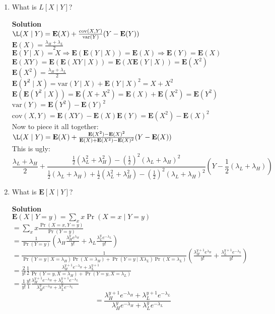 \documentclass[11pt]{article}
\newenvironment{Parts}{\begin{enumerate}[label=(\alph*)]}{\end{enumerate}}
\newcommand*{\Part}{\item}
\newenvironment{Answer}{\vspace{10pt}\begin{mdframed}\textbf{Solution}\\}{\end{mdframed}\vfill\pagebreak[3]}
\newenvironment{Answer}{\vspace{10pt}}{\vfill\pagebreak[3]}
\newcommand*{\E}{\textbf{E}}
\newcommand*{\var}[1]{\text{var}(#1)}
\newcommand*{\cov}[1]{\text{cov}(#1)}
\begin{document}
\begin{Parts}    
  \Part What is $L[X \mid Y]$?
  \begin{Answer}
$\L(X \mid Y)=\E(X)+\frac{\cov{X,Y}}{\var{Y}}(Y-\E(Y))$\\
$\E(X)=\frac{\lambda_H+\lambda_L}{2}$\\
$\E(Y \mid X)=X \Rightarrow \E(\E(Y \mid X))=\E(X) \Rightarrow \E(Y)=\E(X)$\\
$\E(XY)=\E(\E(XY \mid X))=\E(X\E(Y \mid X))=\E(X^2)$\\
$\E(X^2)=\frac{\lambda_H+\lambda_L}{2}$\\
$\E(Y^2 \mid X)=\var{Y \mid X}+\E(Y \mid X)^2=X+X^2$\\
$\E(\E(Y^2 \mid X))=\E(X+X^2)=\E(X)+\E(X^2)=\E(Y^2)$\\
$\var{Y}=\E(Y^2)-\E(Y)^2$\\
$\cov{X,Y}=\E(XY)-\E(X)\E(Y)=\E(X^2)-\E(X)^2$\\
Now to piece it all together:\\
$\L(X \mid Y)=\E(X)+\frac{\E(X^2)-\E(X)^2}{\E(X)+\E(X^2)-\E(X)^2}(Y-\E(X))$\\
This is ugly:\\
$$\frac{\lambda_L+\lambda_H}{2}+\frac{\frac{1}{2}(\lambda_L^2+\lambda_H^2)-(\frac{1}{2})^2(\lambda_L+\lambda_H)^2}{\frac{1}{2}(\lambda_L+\lambda_H)+\frac{1}{2}(\lambda_L^2+\lambda_H^2)-(\frac{1}{2})^2(\lambda_L+\lambda_H)^2}(Y-\frac{1}{2}(\lambda_L+\lambda_H))$$
  \end{Answer}

  \Part What is $\E[X \mid Y]$?
  \begin{Answer}
  $\E(X \mid Y=y)=\sum_xx\Pr(X=x \mid Y=y)$\\
  $=\sum_xx\frac{\Pr(X=x, Y=y)}{\Pr(Y=y)}$\\
  $=\frac{1}{\Pr(Y=y)}(\lambda_H\frac{\lambda_H^ye^{\lambda_H}}{y!}+\lambda_L\frac{\lambda_L^ye^{-\lambda_L}}{y!})$\\
   $=\frac{1}{\Pr(Y=y \mid X=\lambda_H)\Pr(X=\lambda_H)+\Pr(Y=y \mid X \lambda_L)\Pr(X=\lambda_L)}(\frac{\lambda_H^{y+1}e^{\lambda_H}}{y!}+\frac{\lambda_L^{y+1}e^{-\lambda_L}}{y!})$\\
  $=\frac{2}{y!}\frac{1}{2}\frac{\lambda_H^{y+1}e^{-\lambda_H}+\lambda_L^{y+1}}{\Pr(Y=y,X=\lambda_H)+\Pr(Y=y,X=\lambda_L)}$\\
  $=\frac{1}{y!}\frac{y!}{1}\frac{\lambda_H^{y+1}e^{-\lambda_H}+\lambda_L^{y+1}e^{-\lambda_L}}{\lambda_H^ye^{-\lambda_H}+\lambda_L^ye^{-\lambda_L}}$\\
$$=\frac{\lambda_H^{y+1}e^{-\lambda_H}+\lambda_L^{y+1}e^{-\lambda_L}}{\lambda_H^ye^{-\lambda_H}+\lambda_L^ye^{-\lambda_L}}$$ 
  \end{Answer}  
\end{Parts}
\end{document}
